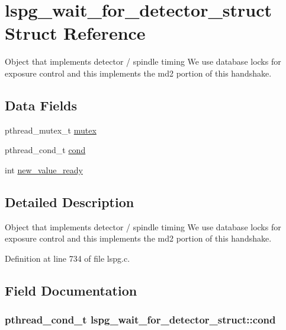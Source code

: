 \hypertarget{structlspg__wait__for__detector__struct}{
\section{lspg\_\-wait\_\-for\_\-detector\_\-struct Struct Reference}
\label{structlspg__wait__for__detector__struct}
}


Object that implements detector / spindle timing We use database locks for exposure control and this implements the md2 portion of this handshake.  
\subsection*{Data Fields}
\begin{DoxyCompactItemize}
\item 
pthread\_\-mutex\_\-t \hyperlink{structlspg__wait__for__detector__struct_a958e9fe59e671e61f95c2ce796ba24ce}{mutex}
\item 
pthread\_\-cond\_\-t \hyperlink{structlspg__wait__for__detector__struct_aa97388f93ca5099196ba0da1e4a5b7bb}{cond}
\item 
int \hyperlink{structlspg__wait__for__detector__struct_ad950e85c70c4473c5c7c40f8ceeae61d}{new\_\-value\_\-ready}
\end{DoxyCompactItemize}


\subsection{Detailed Description}
Object that implements detector / spindle timing We use database locks for exposure control and this implements the md2 portion of this handshake. 

Definition at line 734 of file lspg.c.

\subsection{Field Documentation}
\hypertarget{structlspg__wait__for__detector__struct_aa97388f93ca5099196ba0da1e4a5b7bb}{
\subsubsection[{cond}]{\setlength{\rightskip}{0pt plus 5cm}pthread\_\-cond\_\-t {\bf lspg\_\-wait\_\-for\_\-detector\_\-struct::cond}}}
\label{structlspg__wait__for__detector__struct_aa97388f93ca5099196ba0da1e4a5b7bb}


